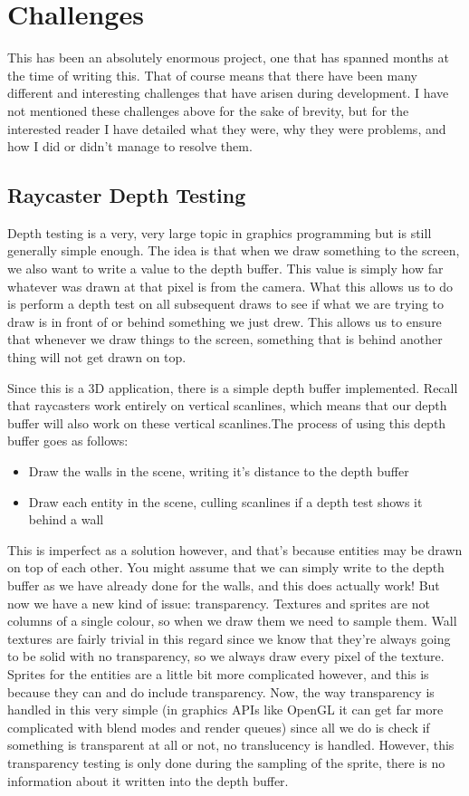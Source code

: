 \documentclass{article}
\begin{document}
\section{Challenges}
This has been an absolutely enormous project, one that has spanned months at the
time of writing this. That of course means that there have been many different
and interesting challenges that have arisen during development. I have not
mentioned these challenges above for the sake of brevity, but for the interested
reader I have detailed what they were, why they were problems, and how I did or
didn't manage to resolve them.

\subsection{Raycaster Depth Testing}
Depth testing is a very, very large topic in graphics programming but is still
generally simple enough. The idea is that when we draw something to the screen,
we also want to write a value to the depth buffer. This value is simply how far
whatever was drawn at that pixel is from the camera. What this allows us to do
is perform a depth test on all subsequent draws to see if what we are trying to
draw is in front of or behind something we just drew. This allows us to ensure
that whenever we draw things to the screen, something that is behind another
thing will not get drawn on top.

Since this is a 3D application, there is a simple depth buffer implemented.
Recall that raycasters work entirely on vertical scanlines, which means that our
depth buffer will also work on these vertical scanlines.The process of using
this depth buffer goes as follows:

\begin{itemize}
    \item Draw the walls in the scene, writing it's distance to the depth buffer
    \item Draw each entity in the scene, culling scanlines if a depth test shows it behind a wall
\end{itemize}

This is imperfect as a solution however, and that's because entities may be
drawn on top of each other. You might assume that we can simply write to the
depth buffer as we have already done for the walls, and this does actually work!
But now we have a new kind of issue: transparency. Textures and sprites are not 
columns of a single colour, so when we draw them we need to sample them. Wall
textures are fairly trivial in this regard since we know that they're always
going to be solid with no transparency, so we always draw every pixel of the
texture. Sprites for the entities are a little bit more complicated however, and
this is because they can and do include transparency. Now, the way transparency
is handled in this very simple (in graphics APIs like OpenGL it can get far more
complicated with blend modes and render queues) since all we do is check if
something is transparent at all or not, no translucency is handled. However,
this transparency testing is only done during the sampling of the sprite, there
is no information about it written into the depth buffer.
\end{document}
